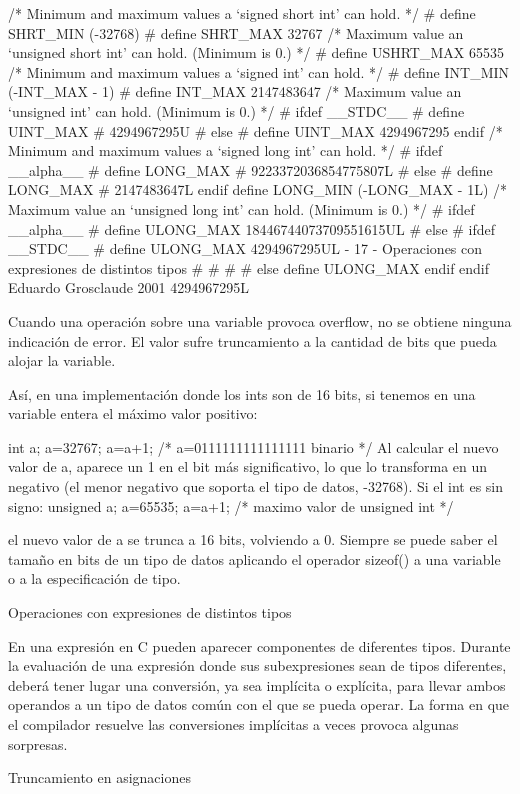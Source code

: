 /* Minimum and maximum values a ‘signed short int’ can hold. */
# define SHRT_MIN
(-32768)
# define SHRT_MAX
32767
/* Maximum value an ‘unsigned short int’ can hold. (Minimum is 0.) */
# define USHRT_MAX
65535
/* Minimum and maximum values a ‘signed int’ can hold. */
# define INT_MIN
(-INT_MAX - 1)
# define INT_MAX
2147483647
/* Maximum value an ‘unsigned int’ can hold. (Minimum is 0.) */
# ifdef __STDC__
# define UINT_MAX
# 4294967295U
# else
# define UINT_MAX
 4294967295
endif
/* Minimum and maximum values a ‘signed long int’ can hold. */
# ifdef __alpha__
# define LONG_MAX
# 9223372036854775807L
# else
# define LONG_MAX
# 2147483647L
 endif
define LONG_MIN
(-LONG_MAX - 1L)
/* Maximum value an ‘unsigned long int’ can hold. (Minimum is 0.) */
# ifdef __alpha__
#
define ULONG_MAX
18446744073709551615UL
# else
#
ifdef __STDC__
#
define ULONG_MAX
4294967295UL
- 17 -
Operaciones con expresiones de distintos tipos
#
#
#
#
else
define ULONG_MAX
endif
endif
Eduardo Grosclaude 2001
4294967295L

Cuando una operación sobre una variable provoca overflow, no se obtiene ninguna indicación de error.
El valor sufre truncamiento a la cantidad de bits que pueda alojar la variable.

Así, en una implementación donde los ints son de 16 bits, si tenemos en una variable entera el máximo
valor positivo:

int a;
a=32767;
a=a+1;
/*
a=0111111111111111 binario */
Al calcular el nuevo valor de a, aparece un 1 en el bit más significativo, lo que lo transforma en un
negativo (el menor negativo que soporta el tipo de datos, -32768).
Si el int es sin signo:
unsigned a;
a=65535;
a=a+1;
/* maximo valor de unsigned int */

el nuevo valor de a se trunca a 16 bits, volviendo a 0.
Siempre se puede saber el tamaño en bits de un tipo de datos aplicando el operador sizeof() a una
variable o a la especificación de tipo.

Operaciones con expresiones de distintos tipos

En una expresión en C pueden aparecer componentes de diferentes tipos. Durante la evaluación de una
expresión donde sus subexpresiones sean de tipos diferentes, deberá tener lugar una conversión, ya sea
implícita o explícita, para llevar ambos operandos a un tipo de datos común con el que se pueda
operar. La forma en que el compilador resuelve las conversiones implícitas a veces provoca algunas
sorpresas.

Truncamiento en asignaciones

